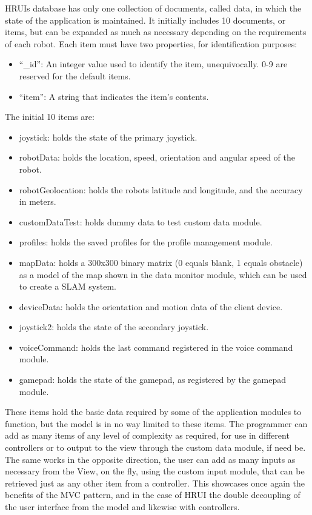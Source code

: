 HRUIs database has only one collection of documents, called data, in which the state of the application is maintained. It 
initially includes 10 documents, or items, but can be expanded as much as necessary depending on the requirements of each 
robot. Each item must have two properties, for identification purposes:
\begin{itemize}
	\item ``\_id'': An integer value used to identify the item, unequivocally. 0-9 are reserved for the default items.
	\item ``item'': A string that indicates the item's contents.
\end{itemize}
The initial 10 items are:
\begin{itemize}
	\item joystick: holds the state of the primary joystick.
	\item robotData: holds the location, speed, orientation and angular speed of the robot.
	\item robotGeolocation: holds the robots latitude and longitude, and the accuracy in meters.
	\item customDataTest: holds dummy data to test custom data module.
	\item profiles: holds the saved profiles for the profile management module.
	\item mapData: holds a 300x300 binary matrix (0 equals blank, 1 equals obstacle) as a model of the map shown in the 
	data monitor module, which can be used to create a SLAM system.
	\item deviceData: holds the orientation and motion data of the client device.
	\item joystick2: holds the state of the secondary joystick.
	\item voiceCommand: holds the last command registered in the voice command module.
	\item gamepad: holds the state of the gamepad, as registered by the gamepad module.
\end{itemize}
These items hold the basic data required by some of the application modules to function, but the model is in no way limited 
to these items. The programmer can add as many items of any level of complexity as required, for use in different 
controllers or to output to the view through the custom data module, if need be. The same works in the opposite direction, 
the user can add as many inputs as necessary from the View, on the fly, using the custom input module, that can be 
retrieved just as any other item from a controller. This showcases once again the benefits of the MVC pattern, and in the 
case of HRUI the double decoupling of the user interface from the model and likewise with controllers.
